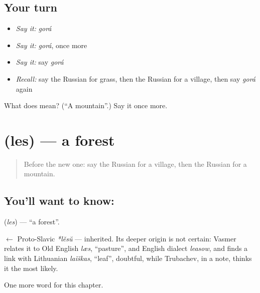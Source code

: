 \subsection*{Your turn}
\begin{itemize}
\raggedright
  \item \emph{Say it:} \emph{gorá}
  \item \emph{Say it:} \emph{gorá}, once more
  \item \emph{Say it:} say \emph{gorá}
  \item \emph{Recall:} say the Russian for grass, then the Russian for a village, then say \emph{gorá} again
\end{itemize}

\begin{tcolorbox}[breakable,colback=teal!4,colframe=teal!35!black,title={Before you move on}]
What does  mean? (\textquotedblleft{}A mountain\textquotedblright{}.) Say it once more.
\end{tcolorbox}
\section[\texorpdfstring{\ru{лес} (les)}{лес (les)}]{ (les) — a forest}

\label{lesson:RU-C56-forest}



\begin{quote}
Before the new one: say the Russian for a village, then the Russian for a mountain.
\end{quote}

\subsection*{You'll want to know: }
\textbf{} (\emph{les}) — \textquotedblleft{}a forest\textquotedblright{}.

\begin{cousinweb}
\textbf{} $\leftarrow$ Proto-Slavic \emph{*lěsŭ} — inherited. Its deeper origin is not certain: Vasmer relates it to Old English \emph{læs}, \textquotedblleft{}pasture\textquotedblright{}, and English dialect \emph{leasow}, and finds a link with Lithuanian \emph{laĩškas}, \textquotedblleft{}leaf\textquotedblright{}, doubtful, while Trubachev, in a note, thinks it the most likely.
\end{cousinweb}

\begin{grammarlens}[title={What you've built}]
One more word for this chapter.
\end{grammarlens}

